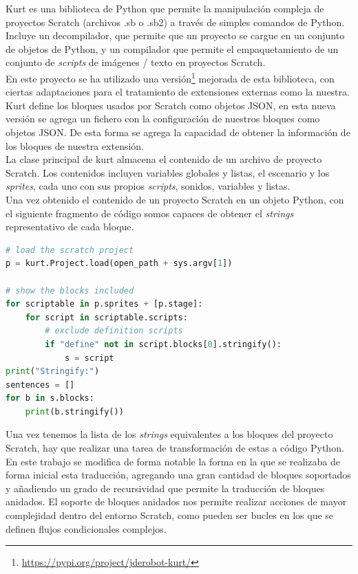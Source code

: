 Kurt es una biblioteca de Python que permite la manipulación compleja de proyectos Scratch (archivos .sb o .sb2) a través de simples comandos de Python. Incluye un decompilador, que permite que un proyecto se cargue en un conjunto de objetos de Python, y un compilador que permite el empaquetamiento de un conjunto de \textit{scripts} de imágenes / texto en proyectos Scratch.\\

En este proyecto se ha utilizado una versión\footnote{\url{https://pypi.org/project/jderobot-kurt/}} mejorada de esta biblioteca, con ciertas adaptaciones para el tratamiento de extensiones externas como la nuestra. Kurt define los bloques usados por Scratch como objetos JSON, en esta nueva versión se agrega un fichero con la configuración de nuestros bloques como objetos JSON. De esta forma se agrega la capacidad de obtener la información de los bloques de nuestra extensión.\\

La clase principal de kurt almacena el contenido de un archivo de proyecto Scratch. Los contenidos incluyen variables globales y listas, el escenario y los \textit{sprites}, cada uno con sus propios \textit{scripts}, sonidos, variables y listas.\\

Una vez obtenido el contenido de un proyecto Scratch en un objeto Python, con el siguiente fragmento de código somos capaces de obtener el \textit{strings} representativo de cada bloque.\\

\begin{lstlisting}[language=python,firstnumber=1]
# load the scratch project
p = kurt.Project.load(open_path + sys.argv[1])

# show the blocks included
for scriptable in p.sprites + [p.stage]:
	for script in scriptable.scripts:
		# exclude definition scripts
		if "define" not in script.blocks[0].stringify():
			s = script
print("Stringify:")
sentences = []
for b in s.blocks:
	print(b.stringify())
\end{lstlisting}

Una vez tenemos la lista de los \textit{strings} equivalentes a los bloques del proyecto Scratch, hay que realizar una tarea de transformación de estas a código Python.\\

En este trabajo se modifica de forma notable la forma en la que se realizaba de forma inicial esta traducción, agregando una gran cantidad de bloques soportados y añadiendo un grado de recursividad que permite la traducción de bloques anidados. El soporte de bloques anidados nos permite realizar acciones de mayor complejidad dentro del entorno Scratch, como pueden ser bucles en los que se definen flujos condicionales complejos.\\

